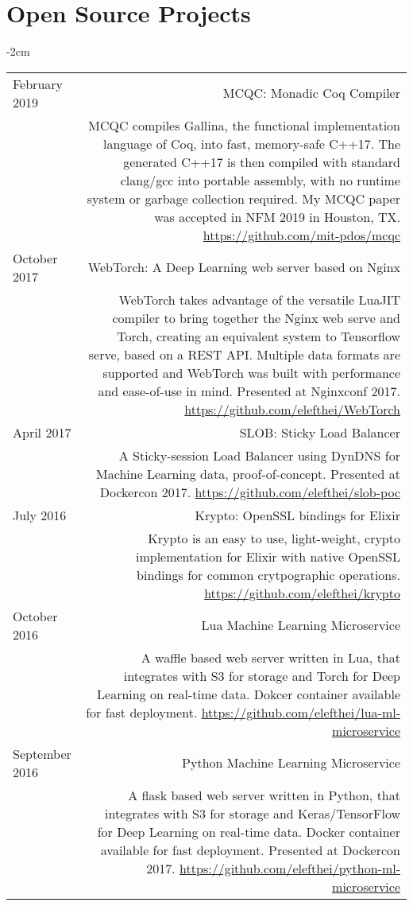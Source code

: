 \documentclass[lettersize,10pt]{article}
\begin{document}
\section{Open Source Projects}
\begin{adjustwidth}{}{-2cm}
  \begin{tabularx}{\textwidth}{L R}
    February 2019 & {\sc MCQC: Monadic Coq Compiler} \\
    & MCQC compiles Gallina, the functional implementation language of Coq, into fast, memory-safe C++17.
    The generated C++17 is then compiled with standard clang/gcc into portable assembly, with no runtime system
    or garbage collection required. My MCQC paper was accepted in NFM 2019 in Houston, TX. \url{https://github.com/mit-pdos/mcqc} \\

    October 2017 & {\sc WebTorch: A Deep Learning web server based on Nginx} \\
    & WebTorch takes advantage of the versatile LuaJIT compiler to bring together the Nginx web serve and Torch, creating an equivalent
    system to Tensorflow serve, based on a REST API. Multiple data formats are supported and WebTorch was built with
    performance and ease-of-use in mind. Presented at Nginxconf 2017. \url{https://github.com/elefthei/WebTorch} \\

    April 2017 & {\sc SLOB: Sticky Load Balancer} \\
    & A Sticky-session Load Balancer using DynDNS for Machine Learning data, proof-of-concept. Presented at Dockercon 2017.
    \url{https://github.com/elefthei/slob-poc} \\

    July 2016 & {\sc Krypto: OpenSSL bindings for Elixir} \\
    & Krypto is an easy to use, light-weight, crypto implementation for Elixir with native OpenSSL bindings for common
    crytpographic operations. \url{https://github.com/elefthei/krypto} \\

    October 2016 & {\sc Lua Machine Learning Microservice} \\
    & A waffle based web server written in Lua, that integrates with S3 for storage and Torch for Deep Learning on real-time data.
    Dokcer container available for fast deployment. \url{https://github.com/elefthei/lua-ml-microservice} \\

    September 2016 & {\sc Python Machine Learning Microservice} \\
    & A flask based web server written in Python, that integrates with S3 for storage and Keras/TensorFlow for Deep Learning on real-time data.
    Docker container available for fast deployment. Presented at Dockercon 2017. \url{https://github.com/elefthei/python-ml-microservice} \\


\end{tabularx}
\end{adjustwidth}
\end{document}
